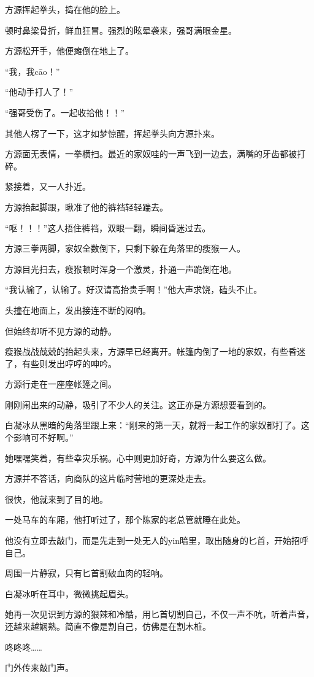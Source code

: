 \begin{this_body}
方源挥起拳头，捣在他的脸上。

顿时鼻梁骨折，鲜血狂冒。强烈的眩晕袭来，强哥满眼金星。

方源松开手，他便瘫倒在地上了。

“我，我cāo！”

“他动手打人了！”

“强哥受伤了。一起收拾他！！”

其他人楞了一下，这才如梦惊醒，挥起拳头向方源扑来。

方源面无表情，一拳横扫。最近的家奴哇的一声飞到一边去，满嘴的牙齿都被打碎。

紧接着，又一人扑近。

方源抬起脚跟，瞅准了他的裤裆轻轻踹去。

“呕！！！”这人捂住裤裆，双眼一翻，瞬间昏迷过去。

方源三拳两脚，家奴全数倒下，只剩下躲在角落里的瘦猴一人。

方源目光扫去，瘦猴顿时浑身一个激灵，扑通一声跪倒在地。

“我认输了，认输了。好汉请高抬贵手啊！”他大声求饶，磕头不止。

头撞在地面上，发出接连不断的闷响。

但始终却听不见方源的动静。

瘦猴战战兢兢的抬起头来，方源早已经离开。帐篷内倒了一地的家奴，有些昏迷了，有些则发出哼哼的呻吟。

方源行走在一座座帐篷之间。

刚刚闹出来的动静，吸引了不少人的关注。这正亦是方源想要看到的。

白凝冰从黑暗的角落里跟上来：“刚来的第一天，就将一起工作的家奴都打了。这个影响可不好啊。”

她嘿嘿笑着，有些幸灾乐祸。心中则更加好奇，方源为什么要这么做。

方源并不答话，向商队的这片临时营地的更深处走去。

很快，他就来到了目的地。

一处马车的车厢，他打听过了，那个陈家的老总管就睡在此处。

他没有立即去敲门，而是先走到一处无人的yin暗里，取出随身的匕首，开始招呼自己。

周围一片静寂，只有匕首割破血肉的轻响。

白凝冰听在耳中，微微挑起眉头。

她再一次见识到方源的狠辣和冷酷，用匕首切割自己，不仅一声不吭，听着声音，还越来越娴熟。简直不像是割自己，仿佛是在割木桩。

咚咚咚……

门外传来敲门声。


\end{this_body}
